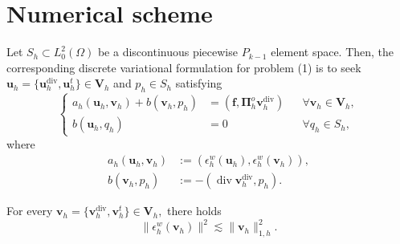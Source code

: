 \documentclass[review,hidelinks,onefignum,onetabnum]{siamart251216}
\begin{document}
\section{Numerical scheme}
Let \(S_h \subset L^2_0(\Omega)\) be a discontinuous piecewise \(P_{k-1}\) element space. Then, the corresponding discrete variational formulation for problem (1) is to seek \(\boldsymbol{u}_h = \{\boldsymbol{u}_h^{\operatorname{div}}, \boldsymbol{u}_h^t\} \in \boldsymbol{V}_h\) and \(p_h \in S_h\) satisfying
\begin{equation}\tag{14}
\left\{
\begin{aligned}
a_h(\boldsymbol{u}_h, \boldsymbol{v}_h) + b(\boldsymbol{v}_h, p_h) &= (\boldsymbol{f}, \boldsymbol{\Pi}_h^o \boldsymbol{v}_h^{\operatorname{div}}) && \forall \boldsymbol{v}_h \in \boldsymbol{V}_h, \\
b(\boldsymbol{u}_h, q_h) &= 0 && \forall q_h \in S_h,
\end{aligned}
\right.
\end{equation}
where
\begin{align*}
a_h(\boldsymbol{u}_h, \boldsymbol{v}_h) &:= (\epsilon_h^w(\boldsymbol{u}_h), \epsilon_h^w(\boldsymbol{v}_h)), \\
b(\boldsymbol{v}_h, p_h) &:= -(\operatorname{div} \boldsymbol{v}_h^{\operatorname{div}}, p_h).
\end{align*}


\begin{lemma}
For every
\(
\boldsymbol{v}_h=\{\boldsymbol{v}_h^{\operatorname{div}},\boldsymbol{v}_h^t\}\in \boldsymbol{V}_h,
\)
there holds
\[
\|\epsilon_h^w(\boldsymbol{v}_h)\|^2
\lesssim
\|\boldsymbol{v}_h\|_{1,h}^2.
\]
\end{lemma}
\end{document}
